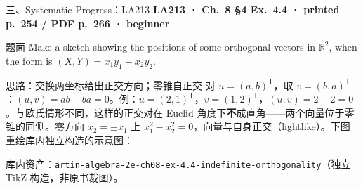 \documentclass[aspectratio=169,10pt,fontset=none]{ctexbeamer}
\newcommand{\ex}[1]{\textcolor{accent}{\footnotesize\bfseries #1}}
\begin{document}
\begin{frame}[t]{三、Systematic Progress：LA213}
  \leavevmode\ex{LA213 · Ch.~8 §4 Ex.~4.4 · printed p.~254 / PDF p.~266 · beginner}
  \begin{block}{\footnotesize 题面}
    \scriptsize Make a sketch showing the positions of some orthogonal vectors in $\mathbb R^2$, when the form is $(X,Y)=x_1y_1-x_2y_2$.
  \end{block}
  \begin{exampleblock}{\footnotesize 思路：交换两坐标给出正交方向；零锥自正交}
    \scriptsize
    对 $u=(a,b)^{\mathsf T}$，取 $v=(b,a)^{\mathsf T}$：$(u,v)=ab-ba=0$。例：$u=(2,1)^{\mathsf T}$，$v=(1,2)^{\mathsf T}$，$(u,v)=2-2=0$。与欧氏情形不同，这样的正交对在 Euclid 角度下\textbf{不}成直角——两个向量位于零锥的同侧。零方向 $x_2=\pm x_1$ 上 $x_1^2-x_2^2=0$，向量与自身正交（lightlike）。下图重绘库内独立构造的示意图：
    \begin{center}
    \end{center}
    库内资产：\texttt{artin-algebra-2e-ch08-ex-4.4-indefinite-orthogonality}（独立 TikZ 构造，非原书裁图）。
  \end{exampleblock}
\end{frame}
\end{document}
